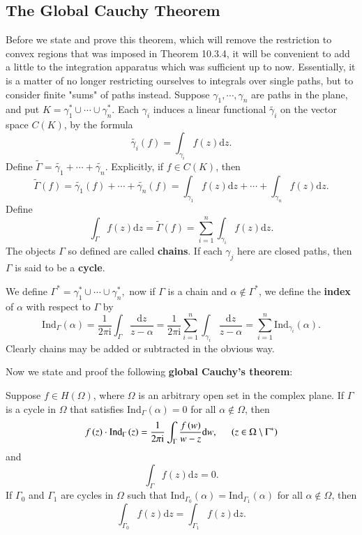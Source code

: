 \subsection{The Global Cauchy Theorem}
Before we state and prove this theorem, which will remove the restriction to convex regions that was imposed in Theorem 10.3.4, it will be convenient to add a little to the integration apparatus which was sufficient up to now. Essentially, it is a matter of no longer restricting ourselves to integrals over single paths, but to consider finite "sums" of paths instead.
Suppose $\gamma_1,\cdots,\gamma_n$ are paths in the plane, and put $K=\gamma_1^*\cup\cdots\cup\gamma_n^*$. Each $\gamma_i$ induces a linear functional $\widetilde{\gamma_i}$ on the vector space $C(K)$, by the formula 
$$
\widetilde{\gamma _i}\left( f \right) =\int_{\gamma _i}{f\left( z \right) \mathrm{d}z}.
$$
Define $\widetilde{\Gamma}=\widetilde{\gamma_1}+\cdots+\widetilde{\gamma_n}$. Explicitly, if $f\in C(K)$, then 
$$
\widetilde{\Gamma }\left( f \right) =\widetilde{\gamma _1}\left( f \right) +\cdots +\widetilde{\gamma _n}\left( f \right) =\int_{\gamma _1}{f\left( z \right) \mathrm{d}z}+\cdots +\int_{\gamma _n}{f\left( z \right) \mathrm{d}z}.
$$
Define 
$$
\int_{\Gamma}{f\left( z \right) \mathrm{d}z}=\widetilde{\Gamma }\left( f \right) =\sum_{i=1}^n{\int_{\gamma _i}{f\left( z \right) \mathrm{d}z}}.
$$
The objects $\Gamma$ so defined are called \textbf{chains}. If each $\gamma_j$ here are closed paths, then $\Gamma$ is said to be a \textbf{cycle}.\par
We define $\Gamma ^*=\gamma _{1}^{*}\cup \cdots \cup \gamma _{n}^{*},$
now if $\Gamma$ is a chain and $\alpha\notin\Gamma^*$, we define the \textbf{index} of $\alpha$ with respect to $\Gamma$ by 
$$
\mathrm{Ind}_{\Gamma}\left( \alpha \right) =\frac{1}{2\pi \mathrm{i}}\int_{\Gamma}{\frac{\mathrm{d}z}{z-\alpha}}=\frac{1}{2\pi \mathrm{i}}\sum_{i=1}^n{\int_{\gamma _i}{\frac{\mathrm{d}z}{z-\alpha}}}=\sum_{i=1}^n{\mathrm{Ind}_{\gamma _i}\left( \alpha \right)}.
$$
Clearly chains may be added or subtracted in the obvious way.\par
Now we state and proof the following \textbf{global Cauchy's theorem}:
\begin{theorem}
Suppose $f\in H(\Omega)$, where $\Omega$ is an arbitrary open set in the complex plane. If $\Gamma$ is a cycle in $\Omega$ that satisfies $\mathrm{Ind}_\Gamma(\alpha)=0$ for all $\alpha\notin\Omega$, then 
$$
f\left( z \right) \cdot \mathrm{Ind}_{\Gamma}\left( z \right) =\frac{1}{2\pi \mathrm{i}}\int_{\Gamma}{\frac{f\left( w \right)}{w-z}\mathrm{d}w},\hspace{0.5cm}\left( z\in \Omega \setminus \Gamma ^* \right) 
$$
and 
$$\int_\Gamma f(z)\mathrm{d}z=0.$$
If $\Gamma_0$ and $\Gamma_1$ are cycles in $\Omega$ such that $\mathrm{Ind}_{\Gamma_0}(\alpha)=\mathrm{Ind}_{\Gamma_1}(\alpha)$ for all $\alpha\notin\Omega$, then 
$$
\int_{\Gamma _0}{f\left( z \right) \mathrm{d}z}=\int_{\Gamma _1}{f\left( z \right) \mathrm{d}z}.
$$
\end{theorem}
